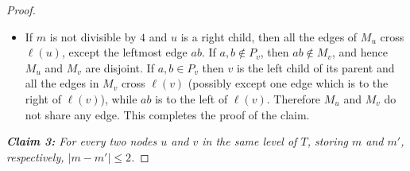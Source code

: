 \documentclass[11pt,a4paper]{article}
\begin{document}
\begin{proof}
\begin{itemize}
  \item If $m$ is not divisible by $4$ and $u$ is a right child, then all the edges of $M_u$ cross $\ell(u)$, except the leftmost edge $ab$. If $a,b\notin P_v$, then $ab\notin M_v$, and hence $M_u$ and $M_v$ are disjoint. If $a,b\in P_v$ then $v$ is the left child of its parent and all the edges in $M_v$ cross $\ell(v)$ (possibly except one edge which is to the right of $\ell(v)$), while $ab$ is to the left of $\ell(v)$. Therefore $M_u$ and $M_v$ do not share any edge. This completes the proof of the claim.
\end{itemize}
\vspace{10pt}

\vspace{10pt}
{\em {\bf Claim 3:} For every two nodes $u$ and $v$ in the same level of $T$, storing $m$ and $m'$, respectively, $|m-m'| \le 2$.}


\end{proof}
\end{document}
